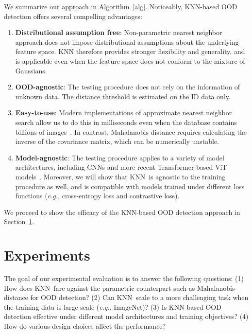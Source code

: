 \documentclass[nohyperref]{article}
\newcommand{\method}{{KNN}}
\theoremstyle{plain}
\theoremstyle{definition}
\theoremstyle{remark}
\begin{document}
We summarize our approach in Algorithm~\ref{alg}. Noticeably, KNN-based OOD detection offers several compelling advantages:
\begin{enumerate}
\vspace{-0.2cm}
     \item \textbf{Distributional assumption free}: Non-parametric nearest neighbor approach does not impose distributional assumptions about the underlying feature space. KNN therefore provides stronger flexibility and generality, and is applicable even when the feature space does not conform to the mixture of Gaussians. 
       \item \textbf{OOD-agnostic}: The testing procedure does not rely on the information of unknown data. The distance threshold is estimated on the ID data only. 
     \item \textbf{Easy-to-use}: Modern implementations of approximate nearest neighbor search
allow us to do this in milliseconds even when the database contains billions of images~\citep{faiss}. In contrast, Mahalanobis distance requires calculating the inverse of the covariance matrix, which can be numerically unstable. 
\vspace{-0.2cm}
   \item \textbf{Model-agnostic}: The testing procedure applies to a variety of model architectures, including CNNs and more recent Transformer-based  ViT models~\citep{dosovitskiy2020image}. Moreover, we will show that \method~is agnostic to the training procedure as well, and is compatible with models trained under different loss functions (\emph{e.g.}, cross-entropy loss and contrastive loss). 
\end{enumerate}
  We proceed to show the efficacy of the KNN-based OOD detection approach in Section~\ref{sec:exp}. 






\section{Experiments}
\label{sec:exp}

The goal of our experimental evaluation is to answer the
following questions: (1) How does \method~fare against the parametric counterpart such as Mahalanobis distance for OOD detection? (2) Can \method~scale to a more challenging task when the training data is large-scale (\emph{e.g.}, ImageNet)? (3) Is KNN-based OOD detection effective under different model architectures and training objectives? (4) How do various design choices affect the performance?
\end{document}
